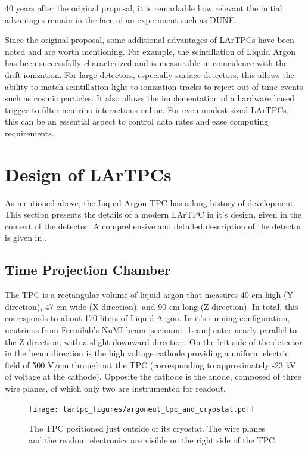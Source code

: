 40 years after the original proposal, it is remarkable how relevant the initial advantages remain in the face of an experiment such as DUNE. 

Since the original proposal, some additional advantages of LArTPCs have been noted and are worth mentioning.  For example, the scintillation of Liquid Argon has been successfully characterized and is measurable in coincidence with the drift ionization.  For large detectors, especially surface detectors, this allows the ability to match scintillation light to ionization tracks to reject out of time events such as cosmic particles.  It also allows the implementation of a hardware based trigger to filter neutrino interactions online.  For even modest sized LArTPCs, this can be an essential aspect to control data rates and ease computing requirements.

\section{Design of LArTPCs}
\label{sec:argoneut_detector}

As mentioned above, the Liquid Argon TPC has a long history of development.  This section presents the details of a modern LArTPC in it's design, given in the context of the \argoneut detector. A comprehensive and detailed description of the \argoneut detector is given in \cite{Anderson:2012vc}.

\subsection{\argoneut Time Projection Chamber}

The \argoneut TPC is a rectangular volume of liquid argon that measures 40 cm high (Y direction), 47 cm wide (X direction), and 90 cm long (Z direction).  In total, this corresponds to about 170 liters of Liquid Argon.  In it's running configuration, neutrinos from Fermilab's NuMI beam \ref{sec:numi_beam} enter nearly parallel to the Z direction, with a slight downward direction.  On the left side of the detector in the beam direction is the high voltage cathode providing a uniform electric field of 500 V/cm throughout the TPC (corresponding to approximately -23 kV of voltage at the cathode).  Opposite the cathode is the anode, composed of three wire planes, of which only two are instrumented for readout.

\begin{figure}[h]
  \centering
  \texttt{[image: lartpc\_figures/argoneut\_tpc\_and\_cryostat.pdf]}
  \caption{The \argoneut TPC positioned just outside of its cryostat.  The wire planes and the readout electronics are visible on the right side of the TPC.}
  \label{fig:argoneut_tpc}
\end{figure}

